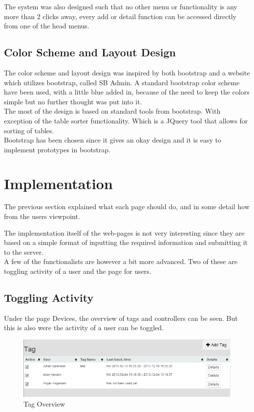 The system was also designed such that no other menu or functionality is any more than 2 clicks away, every add or detail function can be accessed directly from one of the head menus.\\

\subsection{Color Scheme and Layout Design}
The color scheme and layout design was inspired by both bootstrap and a website which utilizes bootstrap, called SB Admin\citep{sbadmin}. A standard bootstrap color scheme have been used, with a little blue added in, because of the need to keep the colors simple but no further thought was put into it.\\
The most of the design is based on standard tools from bootstrap. With exception of the table sorter functionality. Which is a JQuery tool that allows for sorting of tables.\\
Bootstrap has been chosen since it gives an okay design and it is easy to implement prototypes in bootstrap.	


\section{Implementation}
The previous section explained what each page should do, and in some detail how from the users viewpoint.

The implementation itself of the web-pages is not very interesting since they are based on a simple format of inputting the required information and submitting it to the server.\\
A few of the functionalists are however a bit more advanced. Two of these are toggling activity of a user and the page for users.\\

\subsection{Toggling Activity}

Under the page Devices, the overview of tags and controllers can be seen. But this is also were the activity of a user can be toggled.

\begin{figure}[htbp]
	\centering
		\includegraphics[width=1.00\textwidth]{images/tagOverview.PNG}
	\caption{Tag Overview}
	\label{fig:tagOverview}
\end{figure}

